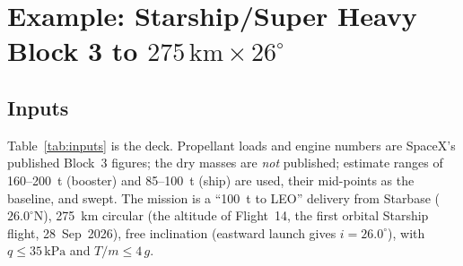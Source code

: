 \documentclass[11pt,a4paper]{article}
\newcommand{\unit}[1]{\,\mathrm{#1}}
\begin{document}
\section{Example: Starship/Super Heavy Block 3 to \texorpdfstring{$275\unit{km}\times26^\circ$}{275 km x 26 deg}}
\label{sec:example}

\subsection{Inputs}
Table~\ref{tab:inputs} is the deck. Propellant loads and engine numbers are SpaceX's published Block~3 figures;
the dry masses are \emph{not} published; estimate ranges of 160--200~t (booster) and 85--100~t (ship) are used, their
mid-points as the baseline, and swept. The mission is a ``100~t to LEO'' delivery from Starbase ($26.0^\circ$N),
275~km circular (the altitude of Flight~14, the first orbital Starship flight, 28~Sep~2026), free inclination
(eastward launch gives $i = 26.0^\circ$), with $q\le35\unit{kPa}$ and $T/m\le4\,g$.
\end{document}
